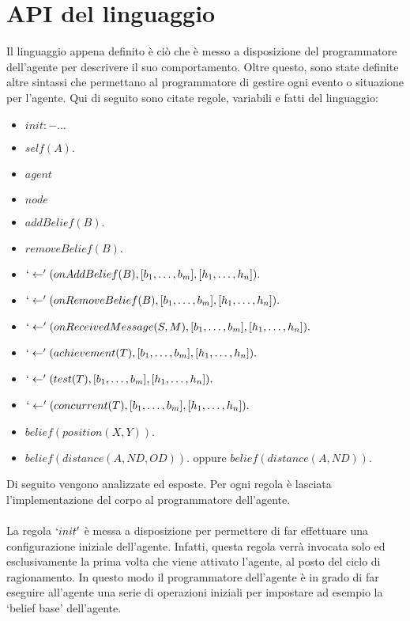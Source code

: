 \section{API del linguaggio}
Il linguaggio appena definito è ciò che è messo a disposizione del programmatore dell'agente per descrivere il suo comportamento. Oltre questo, sono state definite altre sintassi che permettano al programmatore di gestire ogni evento o situazione per l'agente.
Qui di seguito sono citate regole, variabili e fatti del linguaggio:
\begin{itemize}
\item $init :- \ldots$
\item $self(A).$
\item $agent$
\item $node$
\item $addBelief(B).$
\item $removeBelief(B).$
\item $`\leftarrow'(onAddBelief(B), [b_1, \ldots, b_m], [h_1, \ldots, h_n]).$
\item $`\leftarrow'(onRemoveBelief(B), [b_1, \ldots, b_m], [h_1, \ldots, h_n]).$
\item $`\leftarrow'(onReceivedMessage(S,M), [b_1, \ldots, b_m], [h_1, \ldots, h_n]).$
\item $`\leftarrow'(achievement(T), [b_1, \ldots, b_m], [h_1, \ldots, h_n]).$
\item $`\leftarrow'(test(T), [b_1, \ldots, b_m], [h_1, \ldots, h_n]).$
\item $`\leftarrow'(concurrent(T), [b_1, \ldots, b_m], [h_1, \ldots, h_n]).$
\item $belief(position(X,Y)).$
\item $belief(distance(A, ND, OD)).$ oppure $belief(distance(A, ND)).$
\end{itemize}

Di seguito vengono analizzate ed esposte.
Per ogni regola è lasciata l'implementazione del corpo al programmatore dell'agente.

\paragraph*{}
La regola $`init'$ è messa a disposizione per permettere di far effettuare una configurazione iniziale dell'agente. Infatti, questa regola verrà invocata solo ed esclusivamente la prima volta che viene attivato l'agente, al posto del ciclo di ragionamento. In questo modo il programmatore dell'agente è in grado di far eseguire all'agente una serie di operazioni iniziali per impostare ad esempio la `belief base' dell'agente.


